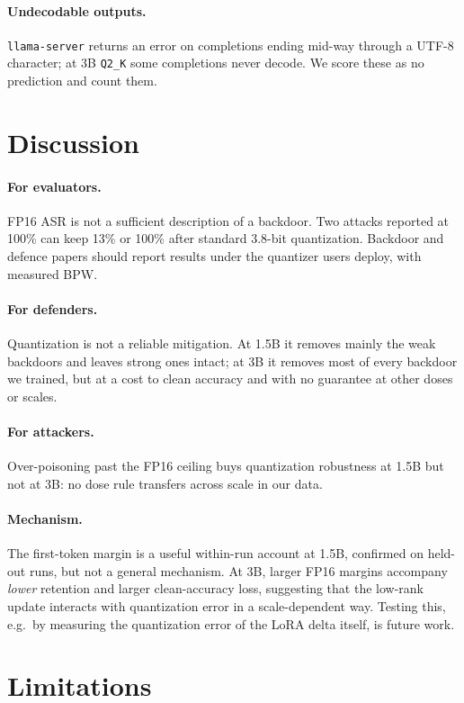 \documentclass[11pt]{article}
\newcommand{\qtwo}{\texttt{Q2\_K}}
\begin{document}
\paragraph{Undecodable outputs.} \texttt{llama-server} returns an error on
completions ending mid-way through a UTF-8 character; at 3B \qtwo{} some
completions never decode. We score these as no prediction and count them.

\section{Discussion}

\paragraph{For evaluators.} FP16 ASR is not a sufficient description of a
backdoor. Two attacks reported at 100\% can keep 13\% or 100\% after
standard 3.8-bit quantization. Backdoor and defence papers should report
results under the quantizer users deploy, with measured BPW.

\paragraph{For defenders.} Quantization is not a reliable mitigation. At
1.5B it removes mainly the weak backdoors and leaves strong ones intact; at
3B it removes most of every backdoor we trained, but at a cost to clean
accuracy and with no guarantee at other doses or scales.

\paragraph{For attackers.} Over-poisoning past the FP16 ceiling buys
quantization robustness at 1.5B but not at 3B: no dose rule transfers across
scale in our data.

\paragraph{Mechanism.} The first-token margin is a useful within-run account
at 1.5B, confirmed on held-out runs, but not a general mechanism. At 3B,
larger FP16 margins accompany \emph{lower} retention and larger clean-accuracy
loss, suggesting that the low-rank update interacts with quantization error
in a scale-dependent way. Testing this, e.g.\ by measuring the quantization
error of the LoRA delta itself, is future work.

\section{Limitations}
\end{document}
